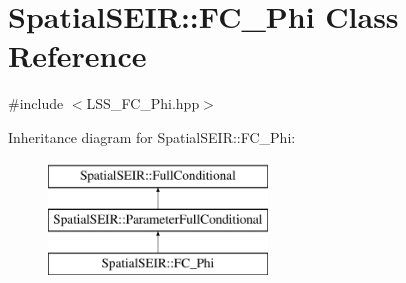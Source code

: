 \hypertarget{classSpatialSEIR_1_1FC__Phi}{\section{Spatial\-S\-E\-I\-R\-:\-:F\-C\-\_\-\-Phi Class Reference}
\label{classSpatialSEIR_1_1FC__Phi}
}


{\ttfamily \#include $<$L\-S\-S\-\_\-\-F\-C\-\_\-\-Phi.\-hpp$>$}

Inheritance diagram for Spatial\-S\-E\-I\-R\-:\-:F\-C\-\_\-\-Phi\-:\begin{figure}[H]
\begin{center}
\leavevmode
\includegraphics[height=3.000000cm]{classSpatialSEIR_1_1FC__Phi}
\end{center}
\end{figure}
